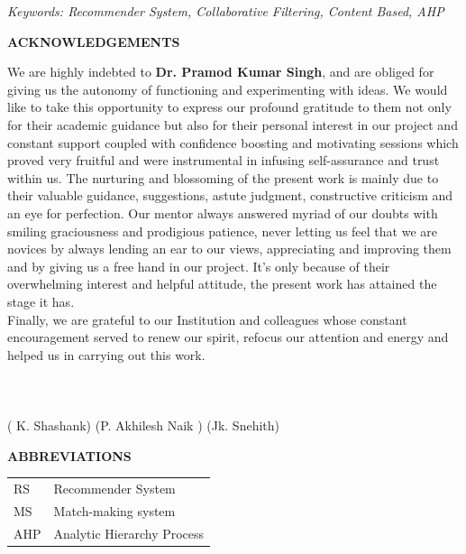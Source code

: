 \documentclass[12pt,oneside]{book}
\begin{document}
{\it Keywords: Recommender System, Collaborative Filtering, Content Based, AHP}
\newpage
\begin{center}
{\large \bf ACKNOWLEDGEMENTS}
\end{center}
We are highly indebted to {\bf Dr. Pramod Kumar Singh}, and are obliged for giving us the autonomy of functioning and experimenting with ideas. We would like to take this opportunity to express our profound gratitude to them not only for their academic guidance but also for their personal interest in our project and constant support coupled with
confidence boosting and motivating sessions which proved very fruitful and were instrumental in infusing self-assurance
and trust within us. The nurturing and blossoming of the present work is mainly due to their valuable guidance,
suggestions, astute judgment, constructive criticism and an eye for perfection. Our mentor always answered myriad of our
doubts with smiling graciousness and prodigious patience, never letting us feel that we are novices by always lending an
ear to our views, appreciating and improving them and by giving us a free hand in our project. It's only
because of their overwhelming interest and helpful attitude, the present work has attained the stage it has. \\
Finally, we are grateful to our Institution and colleagues whose constant encouragement served to renew our spirit,
refocus our attention and energy and helped us in carrying out this work.\\ \\ \\ \\
( K. Shashank) \hspace{1in} (P. Akhilesh Naik ) \hspace{1in} (Jk. Snehith)
\newpage
 \tableofcontents
{}
\listoftables
{}
\listoffigures
\newpage
\begin{center}
{\large\bf ABBREVIATIONS}
\end{center}
\begin{table}[h!]
\begin{tabular}{p{2cm}p{8cm}}
RS & Recommender System \\
MS & Match-making system \\
AHP & Analytic Hierarchy Process\\
\end{tabular}
\end{table}
\newpage \setcounter{page}{1}
\end{document}
